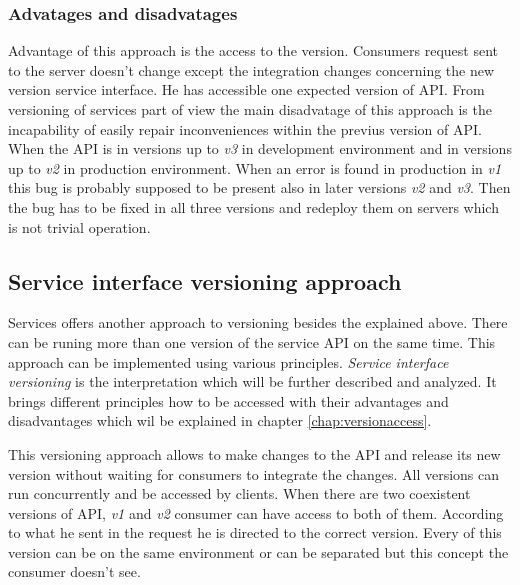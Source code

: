 \subsubsection{Advatages and disadvatages}
Advantage of this approach is the access to the version. Consumers request sent to the server doesn't change except the integration changes concerning the new version service interface. He has accessible one expected version of API.
From versioning of services part of view the main disadvatage of this approach is the incapability of easily repair inconveniences within the previus version of API. When the API is in versions up to \emph{v3} in development environment and in versions up to \emph{v2} in production environment. When an error is found in production in \emph{v1} this bug is probably supposed to be present also in later versions \emph{v2} and \emph{v3}. Then the bug has to be fixed in all three versions and redeploy them on servers which is not trivial operation.

\bigskip


\subsection{Service interface versioning approach}

Services offers another approach to versioning besides the explained above. There can be runing more than one version of the service API on the same time. This approach can be implemented using various principles. \emph{Service interface versioning} is the interpretation which will be further described and analyzed. It brings different principles how to be accessed with their advantages and disadvantages which wil be explained in chapter \ref{chap:versionaccess}.

This versioning approach allows to make changes to the API and release its new version without waiting for consumers to integrate the changes. All versions can run concurrently and be accessed by clients. When there are two coexistent versions of API, \emph{v1} and \emph{v2} consumer can have access to both of them. According to what he sent in the request he is directed to the correct version. Every of this version can be on the same environment or can be separated but this concept the consumer doesn't see.



